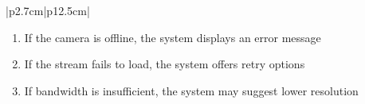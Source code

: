 \begin{table}[H]
\begin{tabular}{|p{2.7cm}|p{12.5cm}|}
\begin{minipage}[t]{\linewidth}
\begin{enumerate}[topsep=0pt,itemsep=1pt,parsep=0pt,partopsep=0pt]
                                              \item If the camera is offline, the system displays an error message
                                              \item If the stream fails to load, the system offers retry options
                                              \item If bandwidth is insufficient, the system may suggest lower resolution
                                          \end{enumerate}
                                      \end{minipage} \\
            \hline
        \end{tabular}
        \label{tab:eng-camera-stream}
    \end{table}
